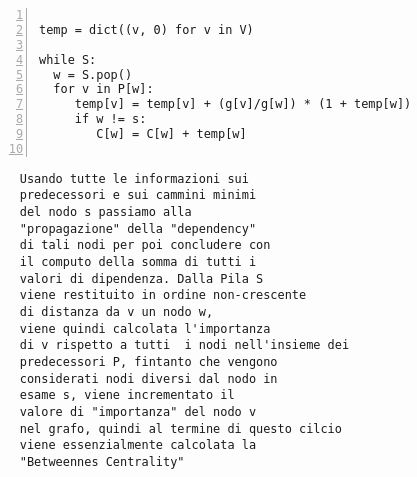 \begin{minipage}{0.49\linewidth}
	\begin{Verbatim}[frame=topline,numbers=left,label=Codice,framesep=3mm]
	
temp = dict((v, 0) for v in V)
	
while S:
  w = S.pop()
  for v in P[w]:
     temp[v] = temp[v] + (g[v]/g[w]) * (1 + temp[w])
     if w != s:
        C[w] = C[w] + temp[w]
        
	\end{Verbatim}
\end{minipage}\hfill
\begin{minipage}{0.49\linewidth}
	\begin{Verbatim}
	 Usando tutte le informazioni sui 
	 predecessori e sui cammini minimi 
	 del nodo s passiamo alla 
	 "propagazione" della "dependency" 
	 di tali nodi per poi concludere con 
	 il computo della somma di tutti i 
	 valori di dipendenza. Dalla Pila S 
	 viene restituito in ordine non-crescente
	 di distanza da v un nodo w, 
	 viene quindi calcolata l'importanza
	 di v rispetto a tutti  i nodi nell'insieme dei
	 predecessori P, fintanto che vengono 
	 considerati nodi diversi dal nodo in
	 esame s, viene incrementato il 
	 valore di "importanza" del nodo v 
	 nel grafo, quindi al termine di questo cilcio
	 viene essenzialmente calcolata la
	 "Betweennes Centrality"
	\end{Verbatim}
\end{minipage}
 \newline\newline